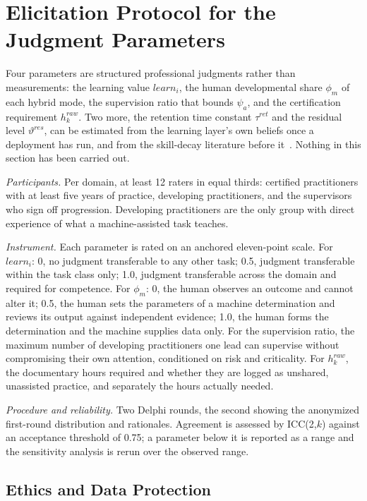 \documentclass[utf8]{frontiers_suppmat}
\begin{document}
\section{Elicitation Protocol for the Judgment Parameters}
\label{app:elicit}

Four parameters are structured professional judgments rather than measurements: the learning value $learn_i$, the human developmental share $\phi_m$ of each hybrid mode, the supervision ratio that bounds $\psi_a$, and the certification requirement $h^{raw}_k$. Two more, the retention time constant $\tau^{ret}$ and the residual level $\vartheta^{res}$, can be estimated from the learning layer's own beliefs once a deployment has run, and from the skill-decay literature before it~\citep{Arthur1998,TatelAckerman2025}. Nothing in this section has been carried out.

\textit{Participants.} Per domain, at least 12 raters in equal thirds: certified practitioners with at least five years of practice, developing practitioners, and the supervisors who sign off progression. Developing practitioners are the only group with direct experience of what a machine-assisted task teaches.

\textit{Instrument.} Each parameter is rated on an anchored eleven-point scale. For $learn_i$: 0, no judgment transferable to any other task; 0.5, judgment transferable within the task class only; 1.0, judgment transferable across the domain and required for competence. For $\phi_m$: 0, the human observes an outcome and cannot alter it; 0.5, the human sets the parameters of a machine determination and reviews its output against independent evidence; 1.0, the human forms the determination and the machine supplies data only. For the supervision ratio, the maximum number of developing practitioners one lead can supervise without compromising their own attention, conditioned on risk and criticality. For $h^{raw}_k$, the documentary hours required and whether they are logged as unshared, unassisted practice, and separately the hours actually needed.

\textit{Procedure and reliability.} Two Delphi rounds, the second showing the anonymized first-round distribution and rationales. Agreement is assessed by ICC(2,$k$) against an acceptance threshold of 0.75; a parameter below it is reported as a range and the sensitivity analysis is rerun over the observed range.

\subsection{Ethics and Data Protection}
\label{app:elicit-ethics}
\end{document}
